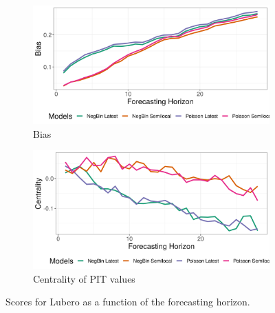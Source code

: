 \begin{figure}[H]
\begin{subfigure}{0.5\textwidth}
  \centering
  \includegraphics[width=\linewidth]{../output/Lubero_bias.png}  
  \caption{Bias}
  \label{fig:Lubero_scores_3}
\end{subfigure}
\begin{subfigure}{0.5\textwidth}
  \centering
  \includegraphics[width=\linewidth]{../output/Lubero_centrality.png}  
  \caption{Centrality of PIT values}
  \label{fig:Lubero_scores_4}
\end{subfigure}
  \caption{Scores for Lubero as a function of the forecasting horizon.}

  \label{fig:nat_scores}
\end{figure}
